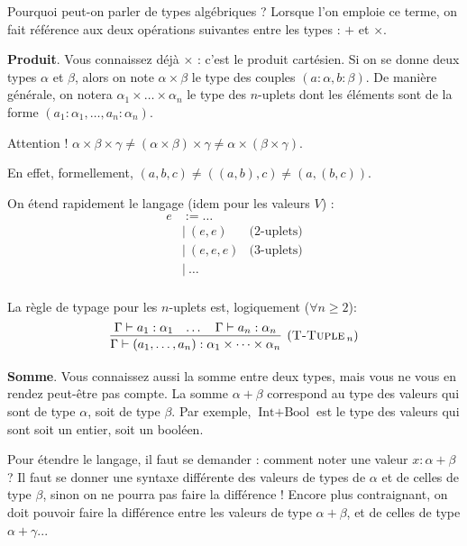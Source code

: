 \documentclass[11pt]{article}
\begin{document}
Pourquoi peut-on parler de types algébriques ? Lorsque l'on emploie ce terme, on fait référence aux deux opérations suivantes entre les types : $+$ et $\times$.

\textbf{Produit}. Vous connaissez déjà $\times$ : c'est le produit cartésien. Si on se donne deux types $\alpha$ et $\beta$, alors on note $\alpha\times\beta$ le type des couples $(a:\alpha, b:\beta)$. De manière générale, on notera $\alpha_1\times\dots\times\alpha_n$ le type des $n$-uplets dont les éléments sont de la forme $(a_1:\alpha_1, \dots, a_n:\alpha_n)$.

\begin{remark}
    Attention ! $\alpha\times\beta\times\gamma \ne (\alpha\times\beta)\times\gamma \ne \alpha\times(\beta\times\gamma)$.    

    En effet, formellement, $(a, b, c) \ne ((a, b), c) \ne (a, (b, c))$.
\end{remark}

On étend rapidement le langage (idem pour les valeurs $V$) :
\begin{equation*}
\begin{aligned}
    e &:= \dots&\\
    &|~(e, e)&\text{(2-uplets)}\\
    &|~(e, e, e)&\text{(3-uplets)}\\
    &|~\dots&\\
\end{aligned}
\end{equation*}

La règle de typage pour les $n$-uplets est, logiquement ($\forall n\ge 2$):
$$
\infer[(\text{\scshape{T-Tuple$\,_n$}})]
{\Gamma\vdash (a_1, \dots, a_n) : \alpha_1\times\dots\times\alpha_n}
{
    \Gamma\vdash a_1:\alpha_1&
    \dots&
    \Gamma\vdash a_n:\alpha_n
}
$$

\textbf{Somme}. Vous connaissez aussi la somme entre deux types, mais vous ne vous en rendez peut-être pas compte. La somme $\alpha+\beta$ correspond au type des valeurs qui sont de type $\alpha$, soit de type $\beta$. Par exemple, $\text{Int}+\text{Bool}$ est le type des valeurs qui sont soit un entier, soit un booléen.

Pour étendre le langage, il faut se demander : comment noter une valeur $x:\alpha+\beta$ ? Il faut se donner une syntaxe différente des valeurs de types de $\alpha$ et de celles de type $\beta$, sinon on ne pourra pas faire la différence ! Encore plus contraignant, on doit pouvoir faire la différence entre les valeurs de type $\alpha+\beta$, et de celles de type $\alpha+\gamma$...
\end{document}
